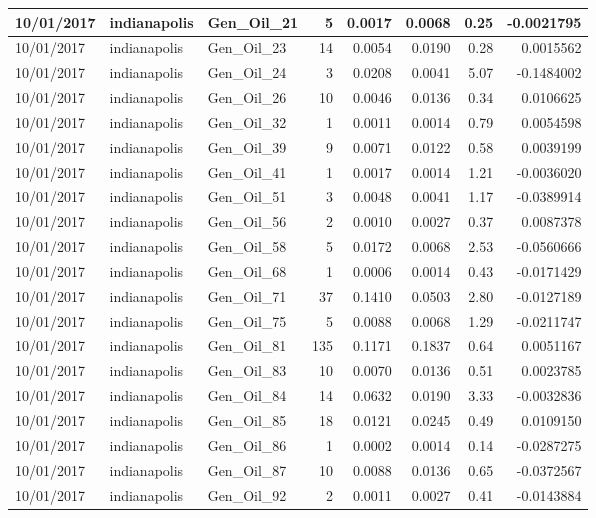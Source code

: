 \documentclass[
  letterpaper,
  DIV=11,
  numbers=noendperiod]{scrartcl}
\begin{document}
\begin{tabular}{l|l|l|r|r|r|r|r}
\hline
10/01/2017 & indianapolis & Gen\_Oil\_21 & 5 & 0.0017 & 0.0068 & 0.25 & -0.0021795\\
\hline
10/01/2017 & indianapolis & Gen\_Oil\_23 & 14 & 0.0054 & 0.0190 & 0.28 & 0.0015562\\
\hline
10/01/2017 & indianapolis & Gen\_Oil\_24 & 3 & 0.0208 & 0.0041 & 5.07 & -0.1484002\\
\hline
10/01/2017 & indianapolis & Gen\_Oil\_26 & 10 & 0.0046 & 0.0136 & 0.34 & 0.0106625\\
\hline
10/01/2017 & indianapolis & Gen\_Oil\_32 & 1 & 0.0011 & 0.0014 & 0.79 & 0.0054598\\
\hline
10/01/2017 & indianapolis & Gen\_Oil\_39 & 9 & 0.0071 & 0.0122 & 0.58 & 0.0039199\\
\hline
10/01/2017 & indianapolis & Gen\_Oil\_41 & 1 & 0.0017 & 0.0014 & 1.21 & -0.0036020\\
\hline
10/01/2017 & indianapolis & Gen\_Oil\_51 & 3 & 0.0048 & 0.0041 & 1.17 & -0.0389914\\
\hline
10/01/2017 & indianapolis & Gen\_Oil\_56 & 2 & 0.0010 & 0.0027 & 0.37 & 0.0087378\\
\hline
10/01/2017 & indianapolis & Gen\_Oil\_58 & 5 & 0.0172 & 0.0068 & 2.53 & -0.0560666\\
\hline
10/01/2017 & indianapolis & Gen\_Oil\_68 & 1 & 0.0006 & 0.0014 & 0.43 & -0.0171429\\
\hline
10/01/2017 & indianapolis & Gen\_Oil\_71 & 37 & 0.1410 & 0.0503 & 2.80 & -0.0127189\\
\hline
10/01/2017 & indianapolis & Gen\_Oil\_75 & 5 & 0.0088 & 0.0068 & 1.29 & -0.0211747\\
\hline
10/01/2017 & indianapolis & Gen\_Oil\_81 & 135 & 0.1171 & 0.1837 & 0.64 & 0.0051167\\
\hline
10/01/2017 & indianapolis & Gen\_Oil\_83 & 10 & 0.0070 & 0.0136 & 0.51 & 0.0023785\\
\hline
10/01/2017 & indianapolis & Gen\_Oil\_84 & 14 & 0.0632 & 0.0190 & 3.33 & -0.0032836\\
\hline
10/01/2017 & indianapolis & Gen\_Oil\_85 & 18 & 0.0121 & 0.0245 & 0.49 & 0.0109150\\
\hline
10/01/2017 & indianapolis & Gen\_Oil\_86 & 1 & 0.0002 & 0.0014 & 0.14 & -0.0287275\\
\hline
10/01/2017 & indianapolis & Gen\_Oil\_87 & 10 & 0.0088 & 0.0136 & 0.65 & -0.0372567\\
\hline
10/01/2017 & indianapolis & Gen\_Oil\_92 & 2 & 0.0011 & 0.0027 & 0.41 & -0.0143884\\

\end{tabular}
\end{document}
